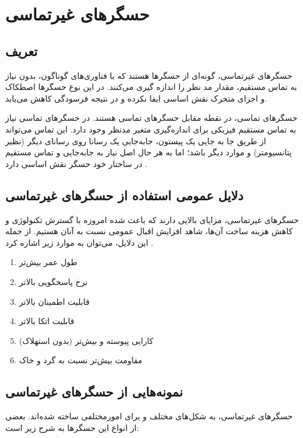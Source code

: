 
\section{حسگرهای غیرتماسی}
\subsection{تعریف}
حسگرهای غیرتماسی، گونه‌ای از حسگرها هستند که با فناوری‌های گوناگون، بدون نیاز به تماس مستقیم، مقدار مد نظر را اندازه گیری‌ می‌کنند. در این نوع حسگر‌ها اصطکاک و اجزای متحرک نقش اساسی ایفا نکرده و در نتیجه فرسودگی کاهش‌ می‌یابد.

حسگرهای تماسی، در نقطه مقابل حسگرهای تماسی هستند. در حسگرهای تماسی نیاز به تماس مستقیم فیزیکی برای اندازه‌گیری متغیر مدنظر وجود دارد. این تماس می‌تواند از طریق جا به جایی یک پیستون، جابه‌جایی یک رسانا روی رسانای دیگر (نظیر پتانسیومتر) و موارد دیگر باشد؛ اما به هر حال اصل نیاز به جا‌به‌جایی و تماس مستقیم در ساختار خود حسگر نقش اساسی دارد
\cite{varriohm_2020}.


\subsection{دلایل عمومی استفاده از حسگر‌های غیرتماسی}
حسگر‌های غیرتماسی، مزایای بالایی دارند که باعث شده امروزه با گسترش تکنولوژی و کاهش هزینه ساخت آن‌ها، شاهد افزایش اقبال عمومی نسبت به آنان هستیم. از جمله این دلایل، می‌توان به موارد زیر اشاره کرد \cite{varriohm_2020}.
\begin{enumerate}
	\item طول عمر بیش‌تر
	\item نرخ پاسخگویی بالاتر
	\item قابلیت اطمینان
	 بالاتر
	\item قابلیت اتکا بالاتر
	\item کارایی پیوسته و بیش‌تر (بدون استهلاک)
	\item مقاومت بیش‌تر نسبت به گرد‌ و خاک
	
	
\end{enumerate}


\subsection{نمونه‌هایی از حسگرهای غیرتماسی}

حسگرهای غیرتماسی، به شکل‌های مختلف و برای امورمختلفی ساخته شده‌اند. بعضی از انواع این حسگرها به شرح زیر است:

